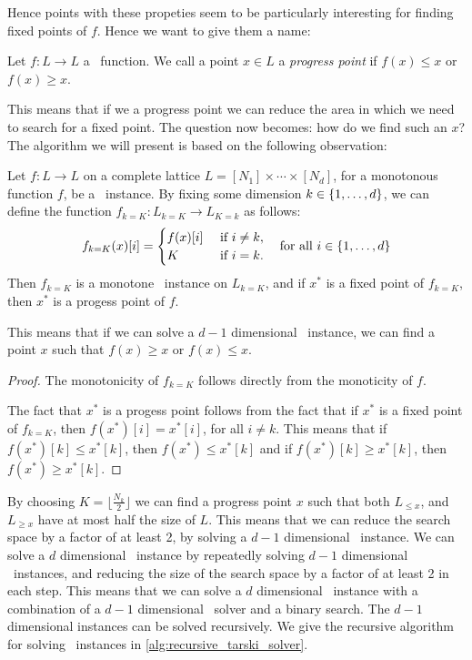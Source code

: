 Hence points with these propeties seem to be particularly interesting for finding fixed points of $f$. Hence we want to give them a name:
\begin{definition}
    Let $f : L \rightarrow L$ a \Tarski\ function. We call a point $x \in L$ a \emph{progress point} if $f(x) \leq x$ or $f(x) \geq x$.
\end{definition}
This means that if we a progress point we can reduce the area in which we need to search for a fixed point. The question now becomes: how do we find such an $x$? The algorithm we will present is based on the following observation:
\begin{remark}
    Let $f : L \rightarrow L$ on a complete lattice ${L = [N_1] \times \cdots \times [N_d]}$, for a monotonous function $f$, be a \Tarski\ instance. By fixing some dimension ${k \in \left\{1, \dots, d\right\}}$, we can define the function ${f_{k=K} : L_{k=K} \rightarrow L_{K=k}}$ as follows:
    \begin{align*}
        f_{k=K}(x)[i] = \begin{cases}
                            f(x)[i] & \text{ if } i \neq k, \\
                            K       & \text{ if } i = k.
                        \end{cases} \quad \text{for all $i \in \left\{1, \dots, d\right\}$}
    \end{align*}
    Then $f_{k=K}$ is a monotone \Tarski\ instance on $L_{k=K}$, and if $x^*$ is a fixed point of $f_{k=K}$, then $x^*$ is a progess point of $f$.
\end{remark}
This means that if we can solve a $d-1$ dimensional \Tarski\ instance, we can find a point $x$ such that $f(x) \geq x$ or $f(x) \leq x$.
\begin{proof}
    The monotonicity of $f_{k=K}$ follows directly from the monoticity of $f$. \par
    The fact that $x^*$ is a progess point follows from the fact that if $x^*$ is a fixed point of $f_{k=K}$, then $f(x^*)[i] = x^*[i]$, for all $i \neq k$. This means that if $f(x^*)[k] \leq x^*[k]$, then $f(x^*) \leq x^*[k]$ and if $f(x^*)[k] \geq x^*[k]$, then $f(x^*) \geq x^*[k]$.
\end{proof}
By choosing $K = \lfloor \frac{N_k}{2} \rfloor$ we can find a progress point $x$ such that both $L_{\leq x}$, and $L_{\geq x}$ have at most half the size of $L$. This means that we can reduce the search space by a factor of at least 2, by solving a $d-1$ dimensional \Tarski\ instance. We can solve a $d$ dimensional \Tarski\ instance by repeatedly solving $d-1$ dimensional \Tarski\ instances, and reducing the size of the search space by a factor of at least 2 in each step. This means that we can solve a $d$ dimensional \Tarski\ instance with a combination of a $d-1$ dimensional \Tarski\ solver and a binary search. The $d-1$ dimensional instances can be solved recursively. We give the recursive algorithm for solving \Tarski\ instances in \cref{alg:recursive_tarski_solver}.
